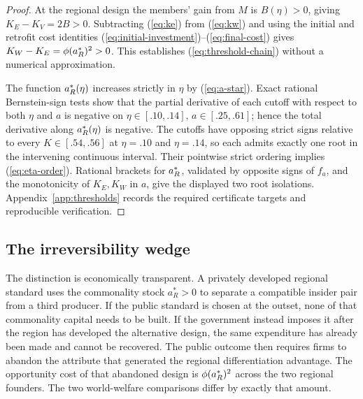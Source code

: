 \begin{proof}
At the regional design the members' gain from \(M\) is
\(B(\eta)>0\), giving \(K_E-K_V=2B>0\).
Subtracting (\ref{eq:ke}) from (\ref{eq:kw}) and
using the initial and retrofit cost identities
(\ref{eq:initial-investment})--(\ref{eq:final-cost}) gives
\(K_W-K_E=\phi(a_R^*)^2>0\).
This establishes (\ref{eq:threshold-chain}) without
a numerical approximation.

The function \(a_R^*(\eta)\) increases strictly in \(\eta\)
by (\ref{eq:a-star}). Exact rational Bernstein-sign
tests show that the partial derivative of each cutoff
with respect to both \(\eta\) and \(a\) is negative on
\(\eta\in[.10,.14],\,a\in[.25,.61]\); hence
the total derivative along \(a_R^*(\eta)\) is negative.
The cutoffs have opposing strict signs relative to
every \(K\in[.54,.56]\) at \(\eta=.10\) and \(\eta=.14\),
so each admits exactly one root in the intervening
continuous interval. Their pointwise strict ordering
implies (\ref{eq:eta-order}). Rational brackets for
\(a_R^*\), validated by opposite signs of \(f_a\),
and the monotonicity of \(K_E,K_W\) in \(a\),
give the displayed two root isolations.
Appendix~\ref{app:thresholds} records the required
certificate targets and reproducible verification.
\end{proof}

\subsection{The irreversibility wedge}\label{subsec:wedge}

The distinction is economically transparent. A privately developed regional standard uses the commonality stock \(a_R^*>0\) to separate a compatible insider pair from a third producer. If the public standard is chosen at the outset, none of that commonality capital needs to be built. If the government instead imposes it after the region has developed the alternative design, the same expenditure has already been made and cannot be recovered. The public outcome then requires firms to abandon the attribute that generated the regional differentiation advantage. The opportunity cost of that abandoned design is
\(\phi(a_R^*)^2\) across the two regional founders. The two world-welfare comparisons differ by exactly that amount.

